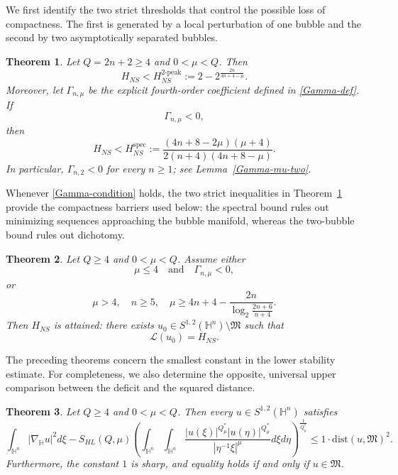 \documentclass[11pt]{article}
\newtheorem{theorem}{Theorem}[section]
\begin{document}
We first identify the two strict thresholds that control the possible loss of compactness. The first is generated by a local perturbation of one bubble and the second by two asymptotically separated bubbles.
\begin{theorem}\label{main thm0}
\begingroup
Let $Q=2n+2\ge4$ and $0<\mu<Q$. Then
\begin{equation}\label{upper2}
H_{NS}<H_{NS}^{2\text{-peak}}
:=2-2^{\frac{2n}{4n+4-\mu}}.
\end{equation}
Moreover, let $\Gamma_{n,\mu}$ be the explicit fourth-order coefficient defined in \eqref{Gamma-def}. If
\begin{equation}\label{Gamma-condition}
\Gamma_{n,\mu}<0,
\end{equation}
then
\begin{equation}\label{upper1}
H_{NS}<H_{NS}^{\mathrm{spec}}
:=\frac{(4n+8-2\mu)(\mu+4)}{2(n+4)(4n+8-\mu)}.
\end{equation}
In particular, $\Gamma_{n,2}<0$ for every $n\ge1$; see Lemma~\ref{Gamma-mu-two}.
\endgroup
\end{theorem}



Whenever \eqref{Gamma-condition} holds, the two strict inequalities in Theorem~\ref{main thm0} provide the compactness barriers used below: the spectral bound rules out minimizing sequences approaching the bubble manifold, whereas the two-bubble bound rules out dichotomy.


\begin{theorem}\label{main thm1}
\begingroup
Let \(Q\ge4\) and \(0<\mu<Q\). Assume either
\[
\mu\le4\quad\text{and}\quad \Gamma_{n,\mu}<0,
\]
or
\begin{equation}\label{ach}
\mu>4,\quad n\ge5,\quad
\mu \ge 4n+4-\frac{2n}{\log_2\frac{2n+6}{n+4}}.
\end{equation}
Then \(H_{NS}\) is attained: there exists
\(u_0\in S^{1,2}(\mathbb{H}^n)\setminus\mathfrak M\) such that
\[
\mathcal L(u_0)=H_{NS}.
\]
\endgroup
\end{theorem}



The preceding theorems concern the smallest constant in the lower stability estimate. For completeness, we also determine the opposite, universal upper comparison between the deficit and the squared distance.
\begin{theorem}\label{main thm2}
Let $Q\geq 4$ and $0<\mu<Q$. {Then every $u\in S^{1,2}(\mathbb{H}^{n})$ satisfies}
\begin{equation}\label{ub1}
 \int_{\mathbb{H}^{n}}|\nabla_{\mathbb{H}} u|^{2}{d}\xi-S_{HL}(Q,\mu) \left(\int_{\mathbb{H}^{n}}\int_{\mathbb{H}^{n}}\frac{|u(\xi)|^{Q^{\ast}_{\mu}}|u(\eta)|
^{Q^{\ast}_{\mu}}}{|\eta^{-1}\xi|^{\mu}}{d}\xi{d}\eta\right)^{\frac{1}{Q^{\ast}_{\mu}}}\leq 1\cdot \mathrm{dist}(u,\mathfrak{M})^2.
\end{equation}
Furthermore, the constant $1$ is sharp, and equality holds if and only if $u\in \mathfrak{M}$.
\end{theorem}
\end{document}
